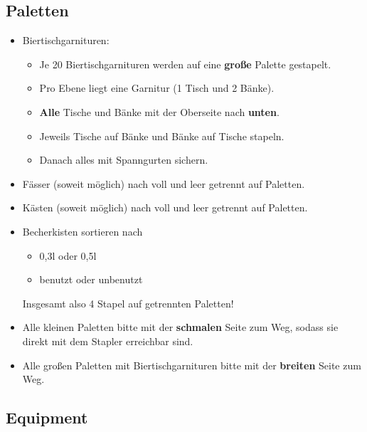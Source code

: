 \subsection{Paletten}
\begin{itemize}
  \item Biertischgarnituren:
    \begin{itemize}
      \item Je 20 Biertischgarnituren werden auf eine \textbf{große} Palette gestapelt.
      \item Pro Ebene liegt eine Garnitur (1 Tisch und 2 Bänke).
      \item \textbf{Alle} Tische und Bänke mit der Oberseite nach \textbf{unten}.
      \item Jeweils Tische auf Bänke und Bänke auf Tische stapeln.
      \item Danach alles mit Spanngurten sichern. %
    \end{itemize}
  \item Fässer (soweit möglich) nach voll und leer getrennt auf Paletten.
  \item Kästen (soweit möglich) nach voll und leer getrennt auf Paletten.
  \item Becherkisten sortieren nach
    \begin{itemize}
      \item 0,3l oder 0,5l
      \item benutzt oder unbenutzt
    \end{itemize}
    Insgesamt also 4 Stapel auf getrennten Paletten!
  \item Alle kleinen Paletten bitte mit der \textbf{schmalen} Seite zum Weg, sodass sie direkt mit dem Stapler erreichbar sind.
  \item Alle großen Paletten mit Biertischgarnituren bitte mit der \textbf{breiten} Seite zum Weg.
\end{itemize}
\subsection{Equipment}
